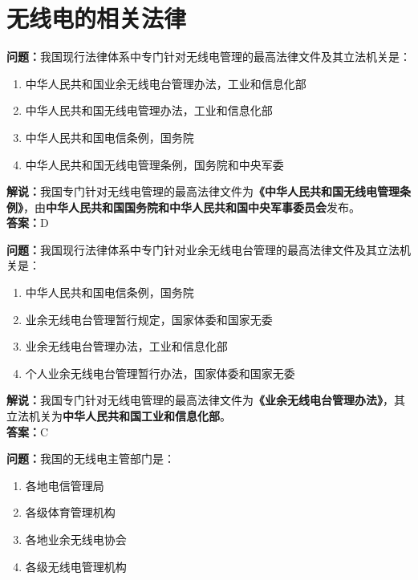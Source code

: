 \chapter{无线电的相关法律}



\noindent\textbf{问题：}我国现行法律体系中专门针对无线电管理的最高法律文件及其立法机关是：

\begin{enumerate}[label=\Alph*), leftmargin=3em]
	\item 中华人民共和国业余无线电台管理办法，工业和信息化部
	\item 中华人民共和国无线电管理办法，工业和信息化部
	\item 中华人民共和国电信条例，国务院
	\item 中华人民共和国无线电管理条例，国务院和中央军委
\end{enumerate}

\noindent\textbf{解说：}我国专门针对无线电管理的最高法律文件为\textbf{《中华人民共和国无线电管理条例》}，由\textbf{中华人民共和国国务院和中华人民共和国中央军事委员会}发布。\\\noindent\textbf{答案：}D

\bigskip


\noindent\textbf{问题：}我国现行法律体系中专门针对业余无线电台管理的最高法律文件及其立法机关是：

\begin{enumerate}[label=\Alph*), leftmargin=3em]
	\item 中华人民共和国电信条例，国务院
	\item 业余无线电台管理暂行规定，国家体委和国家无委
	\item 业余无线电台管理办法，工业和信息化部
	\item 个人业余无线电台管理暂行办法，国家体委和国家无委
\end{enumerate}

\noindent\textbf{解说：}我国专门针对无线电管理的最高法律文件为\textbf{《业余无线电台管理办法》}，其立法机关为\textbf{中华人民共和国工业和信息化部}。\\\noindent\textbf{答案：}C

\bigskip


\noindent\textbf{问题：}我国的无线电主管部门是：

\begin{enumerate}[label=\Alph*), leftmargin=3em]
	\item 各地电信管理局
	\item 各级体育管理机构
	\item 各地业余无线电协会
	\item 各级无线电管理机构
\end{enumerate}

